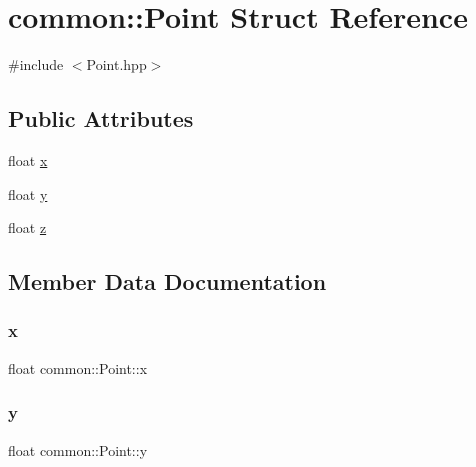 \hypertarget{structcommon_1_1Point}{}\section{common\+:\+:Point Struct Reference}
\label{structcommon_1_1Point}


{\ttfamily \#include $<$Point.\+hpp$>$}

\subsection*{Public Attributes}
\begin{DoxyCompactItemize}
\item 
float \mbox{\hyperlink{structcommon_1_1Point_a90e82224395824a244cd010dab6c8920}{x}}
\item 
float \mbox{\hyperlink{structcommon_1_1Point_a14d850d4a76c81c6ca754b1a4f1c5beb}{y}}
\item 
float \mbox{\hyperlink{structcommon_1_1Point_a03c8daa8b04fbb4ff16f9a21f0223fd0}{z}}
\end{DoxyCompactItemize}


\subsection{Member Data Documentation}
\mbox{\label{structcommon_1_1Point_a90e82224395824a244cd010dab6c8920}} 
\subsubsection{\texorpdfstring{x}{x}}
{\footnotesize\ttfamily float common\+::\+Point\+::x}

\mbox{\label{structcommon_1_1Point_a14d850d4a76c81c6ca754b1a4f1c5beb}} 
\subsubsection{\texorpdfstring{y}{y}}
{\footnotesize\ttfamily float common\+::\+Point\+::y}

\mbox{\label{structcommon_1_1Point_a03c8daa8b04fbb4ff16f9a21f0223fd0}} 
